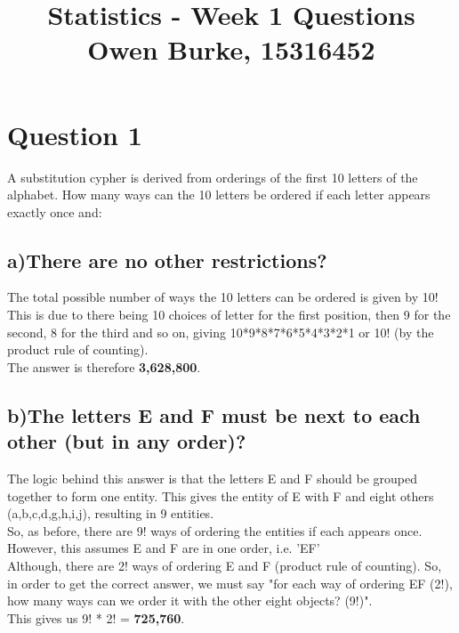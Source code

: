 \documentclass{report}
\title{\textbf{Statistics - Week 1 Questions}\\Owen Burke, 15316452}
\begin{document}
	\maketitle
	\section*{\hfil Question 1 \hfil}
	A substitution cypher is derived from orderings of the first 10 letters of the
	alphabet. How many ways can the 10 letters be ordered if each letter appears exactly once and:
		\subsection*{a)There are no other restrictions?}
		The total possible number of ways the 10 letters can be ordered is given by 10!\\
		This is due to there being 10 choices of letter for the first position, then 9 for the second, 8 for the third and so on, giving 10*9*8*7*6*5*4*3*2*1 or 10! (by the product rule of counting).\\
		The answer is therefore \textbf{3,628,800}.
		\subsection*{b)The letters E and F must be next to each other (but in any order)?}
		The logic behind this answer is that the letters E and F should be grouped together to form one entity. This gives the entity of E with F and eight others (a,b,c,d,g,h,i,j), resulting in 9 entities.\\
		So, as before, there are 9! ways of ordering the entities if each appears once. However, this assumes E and F are in one order, i.e. 'EF'\\
		Although, there are 2! ways of ordering E and F (product rule of counting).
		So, in order to get the correct answer, we must say "for each way of ordering EF (2!), how many ways can we order it with the other eight objects? (9!)".\\
		This gives us 9! * 2! = \textbf{725,760}.
\end{document}
